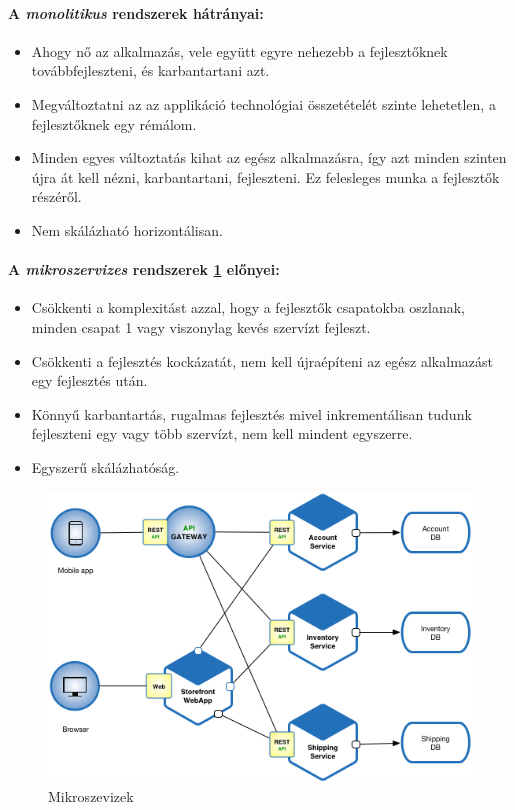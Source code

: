 \paragraph{A \emph{monolitikus} rendszerek hátrányai:}
\begin{itemize}
    \item Ahogy nő az alkalmazás, vele együtt egyre nehezebb a fejlesztőknek továbbfejleszteni, és karbantartani azt.
    \item Megváltoztatni az az applikáció technológiai összetételét szinte lehetetlen, a fejlesztőknek egy rémálom.
    \item Minden egyes változtatás kihat az egész alkalmazásra, így azt minden szinten újra át kell nézni, karbantartani, fejleszteni. Ez felesleges munka a fejlesztők részéről.
    \item Nem skálázható horizontálisan.
\end{itemize}

\paragraph{A \emph{mikroszervizes} rendszerek \ref{fig:micro} előnyei: }
\begin{itemize}
    \item Csökkenti a komplexitást azzal, hogy a fejlesztők csapatokba oszlanak, minden csapat 1 vagy viszonylag kevés szervízt fejleszt.
    \item Csökkenti a fejlesztés kockázatát, nem kell újraépíteni az egész alkalmazást egy fejlesztés után.
    \item Könnyű karbantartás, rugalmas fejlesztés mivel inkrementálisan tudunk fejleszteni egy vagy több szervízt, nem kell mindent egyszerre.
    \item Egyszerű skálázhatóság.
\end{itemize}

\begin{figure}
    \centering
    \includegraphics[scale=0.6]{images/microservices.png}
    \caption{Mikroszevizek}
    \label{fig:micro}
\end{figure}

